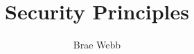\documentclass{csse4400}
\title{Security Principles}
\author{Brae Webb}
\date{\week{2}}
\begin{document}
\makecover





\end{document}
